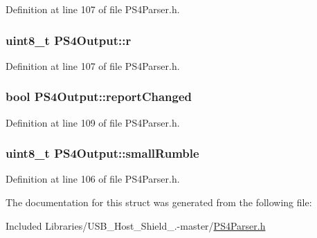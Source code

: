 \-Definition at line 107 of file \-P\-S4\-Parser.\-h.

\hypertarget{struct_p_s4_output_a76a85e749899e2e6cb135a6ec6acabb3}{
\subsubsection[{r}]{\setlength{\rightskip}{0pt plus 5cm}uint8\-\_\-t {\bf \-P\-S4\-Output\-::r}}}\label{struct_p_s4_output_a76a85e749899e2e6cb135a6ec6acabb3}


\-Definition at line 107 of file \-P\-S4\-Parser.\-h.

\hypertarget{struct_p_s4_output_aff395d1c46c9016ab4ea8ddbf034788b}{
\subsubsection[{report\-Changed}]{\setlength{\rightskip}{0pt plus 5cm}bool {\bf \-P\-S4\-Output\-::report\-Changed}}}\label{struct_p_s4_output_aff395d1c46c9016ab4ea8ddbf034788b}


\-Definition at line 109 of file \-P\-S4\-Parser.\-h.

\hypertarget{struct_p_s4_output_a8c6030198733f66a5cb96b8a49e07618}{
\subsubsection[{small\-Rumble}]{\setlength{\rightskip}{0pt plus 5cm}uint8\-\_\-t {\bf \-P\-S4\-Output\-::small\-Rumble}}}\label{struct_p_s4_output_a8c6030198733f66a5cb96b8a49e07618}


\-Definition at line 106 of file \-P\-S4\-Parser.\-h.



\-The documentation for this struct was generated from the following file\-:\begin{DoxyCompactItemize}
\item 
\-Included Libraries/\-U\-S\-B\-\_\-\-Host\-\_\-\-Shield\-\_.-\/master/\hyperlink{_p_s4_parser_8h}{\-P\-S4\-Parser.\-h}\end{DoxyCompactItemize}
